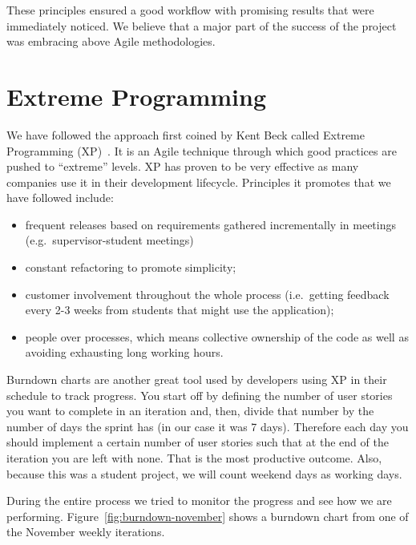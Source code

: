 \documentclass{l4proj}
\begin{document}
These principles ensured a good workflow with promising results that were immediately noticed. We believe that a major part of the
success of the project was embracing above Agile methodologies.

\section{Extreme Programming}

We have followed the approach first coined by Kent Beck called Extreme Programming (XP)~\cite{extreme-programming}. It is an
Agile technique through which good practices are pushed to ``extreme'' levels. XP has proven to be very effective as many companies use it in their development lifecycle. Principles it promotes that we have followed include:

\begin{itemize}
\item frequent releases based on requirements gathered incrementally in meetings (e.g.\ supervisor-student meetings)
\item constant refactoring to promote simplicity;
\item customer involvement throughout the whole process (i.e.\ getting feedback every 2-3 weeks from students that might use the application);
\item people over processes, which means collective ownership of the code as well as avoiding exhausting long working hours.
\end{itemize}

Burndown charts are another great tool used by developers using XP in their schedule to track progress. You start off by defining the number of user stories you want to complete in an iteration and, then, divide that number by the number of days the sprint has (in our case it was 7 days). Therefore each day you should implement a certain number of user stories such that at the end of the iteration you are left with none. That is the most productive outcome. Also, because this was a student project, we will count weekend days as working days.

During the entire process we tried to monitor the progress and see how we are performing.
Figure~\ref{fig:burndown-november} shows a burndown chart from one of the November weekly iterations.
\end{document}

